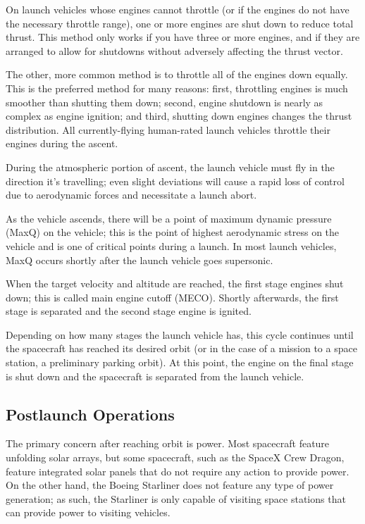 \documentclass[oneside,a5paper]{book}
\begin{document}
On launch vehicles whose engines cannot throttle (or if the engines do
not have the necessary throttle range), one or more engines are shut
down to reduce total thrust. This method only works if you have three
or more engines, and if they are arranged to allow for shutdowns
without adversely affecting the thrust vector.

The other, more common method is to throttle all of the engines down
equally. This is the preferred method for many reasons: first,
throttling engines is much smoother than shutting them down; second,
engine shutdown is nearly as complex as engine ignition; and third,
shutting down engines changes the thrust distribution. All
currently-flying human-rated launch vehicles throttle their engines
during the ascent.

During the atmospheric portion of ascent, the launch vehicle must fly
in the direction it’s travelling; even slight deviations will cause a
rapid loss of control due to aerodynamic forces and necessitate a
launch abort.

As the vehicle ascends, there will be a point of maximum dynamic
pressure (MaxQ) on the vehicle; this is the point of highest
aerodynamic stress on the vehicle and is one of critical points during
a launch. In most launch vehicles, MaxQ occurs shortly after the
launch vehicle goes supersonic.

When the target velocity and altitude are reached, the first stage
engines shut down; this is called main engine cutoff (MECO). Shortly
afterwards, the first stage is separated and the second stage engine
is ignited.

Depending on how many stages the launch vehicle has, this cycle
continues until the spacecraft has reached its desired orbit (or in
the case of a mission to a space station, a preliminary parking
orbit). At this point, the engine on the final stage is shut down and
the spacecraft is separated from the launch vehicle.

\subsection{Postlaunch Operations}

The primary concern after reaching orbit is power. Most spacecraft
feature unfolding solar arrays, but some spacecraft, such as the
SpaceX Crew Dragon, feature integrated solar panels that do not
require any action to provide power. On the other hand, the Boeing
Starliner does not feature any type of power generation; as such, the
Starliner is only capable of visiting space stations that can provide
power to visiting vehicles.
\end{document}

